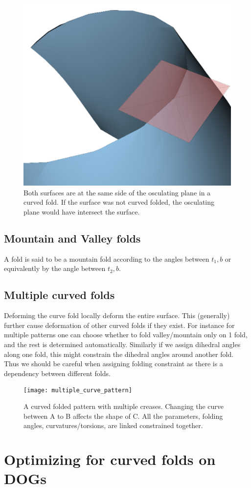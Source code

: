 \documentclass{article}
\theoremstyle{definition}
\begin{document}
\begin{figure} [h]
	\centering
	\includegraphics[width=0.5\linewidth]{plane_side}
	\caption{Both surfaces are at the same side of the osculating plane in a curved fold. If the surface was not curved folded, the osculating plane would have intersect the surface.}
	\label{fig:curved_fold_through_curve}
\end{figure}

\subsection{Mountain and Valley folds}
A fold is said to be a mountain fold according to the angles between $t_1,b$ or equivalently by the angle between $t_2,b$.

\subsection{Multiple curved folds}
Deforming the curve fold locally deform the entire surface. This (generally) further cause deformation of other curved folds if they exist. For instance for multiple patterns one can choose whether to fold valley/mountain only on 1 fold, and the rest is determined automatically. Similarly if we assign dihedral angles along one fold, this might constrain the dihedral angles around another fold. Thus we should be careful when assigning folding constraint as there is a dependency between different folds.

\begin{figure} [h]
	\centering
	\texttt{[image: multiple\_curve\_pattern]}
	\caption{A curved folded pattern with multiple creases. Changing the curve between A to B affects the shape of C. All the parameters, folding angles, curvatures/torsions, are linked constrained together.}
	\label{fig:multiple_curve_pattern}
\end{figure}
	
\section{Optimizing for curved folds on DOGs}
\end{document}
